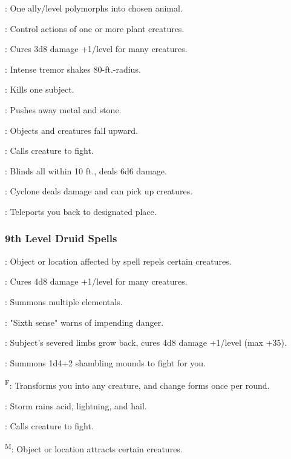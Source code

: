 : One ally/level polymorphs into chosen animal.

: Control actions of one or more plant creatures.

: Cures 3d8 damage +1/level for many creatures.

: Intense tremor shakes 80-ft.-radius.

: Kills one subject.

: Pushes away metal and stone.

: Objects and creatures fall upward.

: Calls creature to fight.

: Blinds all within 10 ft., deals 6d6 damage.

: Cyclone deals damage and can pick up creatures.

: Teleports you back to designated place.

\subsubsection{9th Level Druid Spells}

: Object or location affected by spell repels certain creatures.

: Cures 4d8 damage +1/level for many creatures.

: Summons multiple elementals.

: "Sixth sense" warns of impending danger.

: Subject's severed limbs grow back, cures 4d8 damage +1/level (max +35).

: Summons 1d4+2 shambling mounds to fight for you.

\textsuperscript{F}: Transforms you into any creature, and change forms once per round.

: Storm rains acid, lightning, and hail.

: Calls creature to fight.

\textsuperscript{M}: Object or location attracts certain creatures.

